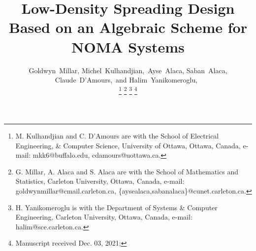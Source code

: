 \documentclass[journal,comsoc]{IEEEtran}
\begin{document}
%
\title{Low-Density Spreading Design Based on an Algebraic Scheme for NOMA Systems}
%
%
%

\author{Goldwyn~Millar, Michel~Kulhandjian,~Ayse~Alaca, Saban~Alaca,  Claude~D'Amours,~and Halim~Yanikomeroglu,~

\thanks{M. Kulhandjian and C. D'Amours are with the School of Electrical Engineering, \& Computer Science, University of Ottawa, Ottawa, Canada, e-mail: mkk6@buffalo.edu, cdamours@uottawa.ca.}%
\thanks{G. Millar, A. Alaca and S. Alaca are with the School of Mathematics and Statistics, Carleton University, Ottawa, Canada, e-mail:
goldwynmillar@cmail.carleton.ca, \{aysealaca,sabanalaca\}@cunet.carleton.ca.}
\thanks{H. Yanikomeroglu is with the Department of Systems \& Computer Engineering, Carleton University, Ottawa, Canada, e-mail: halim@sce.carleton.ca.}
\thanks{Manuscript received Dec. 03, 2021;}
}
\end{document}
